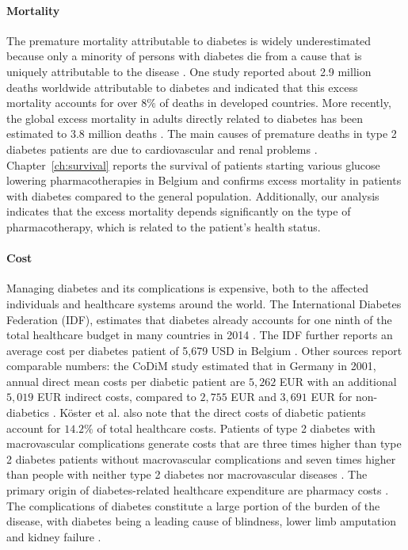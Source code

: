 \paragraph{Mortality} 
The premature mortality attributable to diabetes is widely underestimated because only a minority of persons with diabetes die from a cause that is uniquely attributable to the disease \citep{beulens2010global}. One study reported about 2.9 million deaths worldwide attributable to diabetes \citep{roglic2005burden} and indicated that this excess mortality accounts for over $8\%$ of deaths in developed countries. More recently, the global excess mortality in adults directly related to diabetes has been estimated to 3.8 million deaths \citep{beulens2010global}. The main causes of premature deaths in type 2 diabetes patients are due to cardiovascular and renal problems \citep{morrish2001mortality, beulens2010global}. 
Chapter~\ref{ch:survival} reports the survival of patients starting various glucose lowering pharmacotherapies in Belgium and confirms excess mortality in patients with diabetes compared to the general population. Additionally, our analysis indicates that the excess mortality depends significantly on the type of pharmacotherapy, which is related to the patient's health status.


\paragraph{Cost} Managing diabetes and its complications is expensive, both to the affected individuals and healthcare systems around the world.  The International Diabetes Federation (IDF), estimates that diabetes already accounts for one ninth of the total healthcare budget in many countries in 2014 \citep{IDFfacts}. The IDF further reports an average cost per diabetes patient of 5,679 USD in Belgium \citep{IDFatlas}. Other sources report comparable numbers: the CoDiM study estimated that in Germany in 2001, annual direct mean costs per diabetic patient are $5,262$ EUR with an additional $5,019$ EUR indirect costs, compared to $2,755$ EUR and $3,691$ EUR for non-diabetics \citep{koster2006cost}. K\"oster et al. \citep{koster2006cost} also note that the direct costs of diabetic patients account for $14.2\%$ of total healthcare costs. Patients of type 2 diabetes with macrovascular complications generate costs that are three times higher than type 2 diabetes patients without macrovascular complications and seven times higher than people with neither type 2 diabetes nor macrovascular diseases \citep{beulens2010global}. The primary origin of diabetes-related healthcare expenditure are pharmacy costs \citep{nichols2002impact, gandra2006total}. The complications of diabetes constitute a large portion of the burden of the disease, with diabetes being a leading cause of blindness, lower limb amputation and kidney failure \citep{beulens2010global}. 


